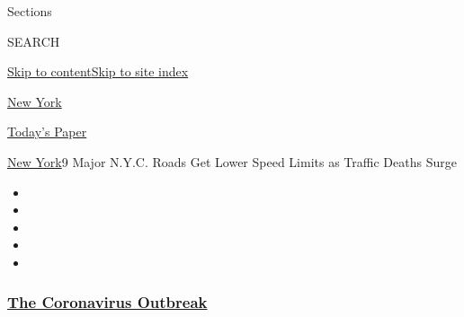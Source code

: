 Sections

SEARCH

\protect\hyperlink{site-content}{Skip to
content}\protect\hyperlink{site-index}{Skip to site index}

\href{https://www.nytimes3xbfgragh.onion/section/nyregion}{New York}

\href{https://myaccount.nytimes3xbfgragh.onion/auth/login?response_type=cookie\&client_id=vi}{}

\href{https://www.nytimes3xbfgragh.onion/section/todayspaper}{Today's
Paper}

\href{/section/nyregion}{New York}\textbar{}9 Major N.Y.C. Roads Get
Lower Speed Limits as Traffic Deaths Surge

\begin{itemize}
\item
\item
\item
\item
\item
\end{itemize}

\hypertarget{the-coronavirus-outbreak}{%
\subsubsection{\texorpdfstring{\href{https://www.nytimes3xbfgragh.onion/news-event/coronavirus?name=styln-coronavirus-national\&region=TOP_BANNER\&block=storyline_menu_recirc\&action=click\&pgtype=Article\&impression_id=2879ff80-f4c5-11ea-96bf-bf14b5b9665f\&variant=undefined}{The
Coronavirus
Outbreak}}{The Coronavirus Outbreak}}\label{the-coronavirus-outbreak}}

